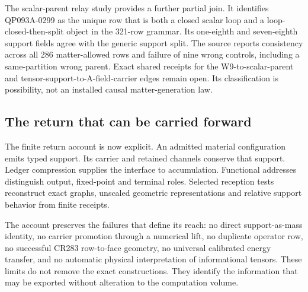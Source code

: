 The scalar-parent relay study provides a further partial join. It identifies QP093A-0299 as the unique row that is both a closed scalar loop and a loop-closed-then-split object in the 321-row grammar. Its one-eighth and seven-eighth support fields agree with the generic support split. The source reports consistency across all 286 matter-allowed rows and failure of nine wrong controls, including a same-partition wrong parent. Exact shared receipts for the W9-to-scalar-parent and tensor-support-to-A-field-carrier edges remain open. Its classification is possibility, not an installed causal matter-generation law.

\subsection{The return that can be carried forward}

The finite return account is now explicit. An admitted material configuration emits typed support. Its carrier and retained channels conserve that support. Ledger compression supplies the interface to accumulation. Functional addresses distinguish output, fixed-point and terminal roles. Selected reception tests reconstruct exact graphs, unscaled geometric representations and relative support behavior from finite receipts.

The account preserves the failures that define its reach: no direct support-as-mass identity, no carrier promotion through a numerical lift, no duplicate operator row, no successful CR283 row-to-face geometry, no universal calibrated energy transfer, and no automatic physical interpretation of informational tensors. These limits do not remove the exact constructions. They identify the information that may be exported without alteration to the computation volume.
